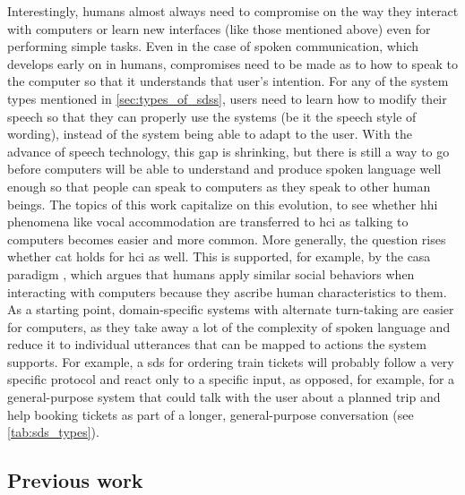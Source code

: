 Interestingly, humans almost always need to compromise on the way they interact with computers or learn new interfaces (like those mentioned above) even for performing simple tasks.
Even in the case of spoken communication, which develops early on in humans, compromises need to be made as to how to speak to the computer so that it understands that user's intention.
For any of the system types mentioned in \cref{sec:types_of_sdss}, users need to learn how to modify their speech so that they can properly use the systems (be it the speech style of wording), instead of the system being able to adapt to the user.
With the advance of speech technology, this gap is shrinking, but there is still a way to go before computers will be able to understand and produce spoken language well enough so that people can speak to computers as they speak to other human beings.
The topics of this work capitalize on this evolution, to see whether \ac{hhi} phenomena like vocal accommodation are transferred to \ac{hci} as talking to computers becomes easier and more common.
More generally, the question rises whether \ac{cat} holds for \ac{hci} as well.
This is supported, for example, by the \ac{casa} paradigm \citep{Nass1994computers, Nass2000machines},
which argues that humans apply similar social behaviors when interacting with computers because they ascribe human characteristics to them.
As a starting point, domain-specific systems with alternate turn-taking are easier for computers, as they take away a lot of the complexity of spoken language and reduce it to individual utterances that can be mapped to actions the system supports.
For example, a \ac{sds} for ordering train tickets will probably follow a very specific protocol and react only to a specific input, as opposed, for example, for a general-purpose system that could talk with the user about a planned trip and help booking tickets as part of a longer, general-purpose conversation (see \cref{tab:sds_types}).

\subsection{Previous work}
\label{subsec:previous_work}


